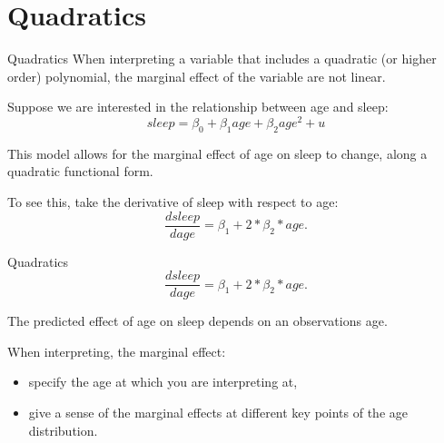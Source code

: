 \documentclass[
  ignorenonframetext,
]{beamer}
\begin{document}
\hypertarget{quadratics}{%
\section{Quadratics}\label{quadratics}}

\begin{frame}{Quadratics}
\protect\hypertarget{quadratics-1}{}
When interpreting a variable that includes a quadratic (or higher order)
polynomial, the marginal effect of the variable are not linear.

Suppose we are interested in the relationship between age and sleep: \[
sleep=\beta_0+\beta_1 age+\beta_2 age^2+u
\]

This model allows for the marginal effect of age on sleep to change,
along a quadratic functional form.

To see this, take the derivative of sleep with respect to age: \[
\frac{dsleep}{dage}=\beta_1+2*\beta_2*age.
\]
\end{frame}

\begin{frame}{Quadratics}
\protect\hypertarget{quadratics-2}{}
\[
\frac{dsleep}{dage}=\beta_1+2*\beta_2*age.
\]

The predicted effect of age on sleep depends on an observations age.

When interpreting, the marginal effect:

\begin{itemize}
\item
  specify the age at which you are interpreting at,
\item
  give a sense of the marginal effects at different key points of the
  age distribution.
\end{itemize}
\end{frame}
\end{document}
